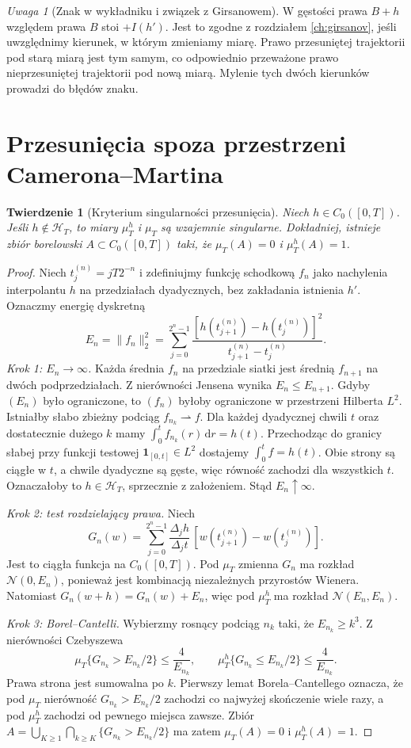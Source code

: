 \documentclass[11pt,a4paper,oneside]{report}
\numberwithin{equation}{chapter}
\theoremstyle{plain}
\newtheorem{twierdzenie}{Twierdzenie}[chapter]
\theoremstyle{definition}
\theoremstyle{remark}
\newtheorem{uwaga}{Uwaga}[chapter]
\newcommand{\calH}{\mathcal{H}}
\newcommand{\ind}[1]{\mathbf{1}_{#1}}
\newcommand{\dd}{\mathrm{d}}
\newcommand{\Normal}{\mathcal{N}}
\begin{document}
\begin{uwaga}[Znak w wykładniku i związek z Girsanowem]
W gęstości prawa $B+h$ względem prawa $B$ stoi
$+I(h')$. Jest to zgodne z rozdziałem \ref{ch:girsanov},
jeśli uwzględnimy kierunek, w którym zmieniamy miarę.
Prawo przesuniętej trajektorii pod starą miarą jest tym
samym, co odpowiednio przeważone prawo nieprzesuniętej
trajektorii pod nową miarą. Mylenie tych dwóch kierunków
prowadzi do błędów znaku.
\end{uwaga}

\section{Przesunięcia spoza przestrzeni Camerona--Martina}\label{sec:volIII:09:05}

\begin{twierdzenie}[Kryterium singularności przesunięcia]\label{thm:volIII:09:05}
\label{th:cm-singular}
Niech $h\in C_0([0,T])$. Jeśli $h\notin\calH_T$,
to miary $\mu_T^h$ i $\mu_T$ są wzajemnie singularne.
Dokładniej, istnieje zbiór borelowski $A\subset C_0([0,T])$
taki, że $\mu_T(A)=0$ i $\mu_T^h(A)=1$.
\end{twierdzenie}
\begin{proof}
Niech $t_j^{(n)}=jT2^{-n}$ i zdefiniujmy funkcję
schodkową $f_n$ jako nachylenia interpolantu $h$ na
przedziałach dyadycznych, bez zakładania istnienia $h'$.
Oznaczmy energię dyskretną
\[
E_n=\|f_n\|_2^2=
\sum_{j=0}^{2^n-1}\frac{[h(t_{j+1}^{(n)})-h(t_j^{(n)})]^2}
{t_{j+1}^{(n)}-t_j^{(n)}}.
\]
\emph{Krok 1: $E_n\to\infty$.} Każda średnia $f_n$ na
przedziale siatki jest średnią $f_{n+1}$ na dwóch
podprzedziałach. Z nierówności Jensena wynika
$E_n\le E_{n+1}$. Gdyby $(E_n)$ było ograniczone,
to $(f_n)$ byłoby ograniczone w przestrzeni Hilberta $L^2$.
Istniałby słabo zbieżny podciąg $f_{n_k}\rightharpoonup f$.
Dla każdej dyadycznej chwili $t$ oraz dostatecznie dużego $k$
mamy $\int_0^t f_{n_k}(r)\,\dd r=h(t)$.
Przechodząc do granicy słabej przy funkcji testowej
$\ind{[0,t]}\in L^2$ dostajemy $\int_0^t f=h(t)$.
Obie strony są ciągłe w $t$, a chwile dyadyczne są gęste,
więc równość zachodzi dla wszystkich $t$.
Oznaczałoby to $h\in\calH_T$, sprzecznie z założeniem.
Stąd $E_n\uparrow\infty$.

\emph{Krok 2: test rozdzielający prawa.} Niech
\[
G_n(w)=\sum_{j=0}^{2^n-1}\frac{\Delta_j h}{\Delta_j t}
\,[w(t_{j+1}^{(n)})-w(t_j^{(n)})].
\]
Jest to ciągła funkcja na $C_0([0,T])$.
Pod $\mu_T$ zmienna $G_n$ ma rozkład $\Normal(0,E_n)$,
ponieważ jest kombinacją niezależnych przyrostów Wienera.
Natomiast $G_n(w+h)=G_n(w)+E_n$, więc pod $\mu_T^h$
ma rozkład $\Normal(E_n,E_n)$.

\emph{Krok 3: Borel--Cantelli.} Wybierzmy rosnący podciąg
$n_k$ taki, że $E_{n_k}\ge k^3$.
Z nierówności Czebyszewa
\[
\mu_T\{G_{n_k}>E_{n_k}/2\}\le\frac4{E_{n_k}},\qquad
\mu_T^h\{G_{n_k}\le E_{n_k}/2\}\le\frac4{E_{n_k}}.
\]
Prawa strona jest sumowalna po $k$. Pierwszy lemat
Borela--Cantellego oznacza, że pod $\mu_T$ nierówność
$G_{n_k}>E_{n_k}/2$ zachodzi co najwyżej skończenie wiele razy,
a pod $\mu_T^h$ zachodzi od pewnego miejsca zawsze.
Zbiór
$A=\bigcup_{K\ge1}\bigcap_{k\ge K}\{G_{n_k}>E_{n_k}/2\}$
ma zatem $\mu_T(A)=0$ i $\mu_T^h(A)=1$.
\end{proof}
\end{document}
